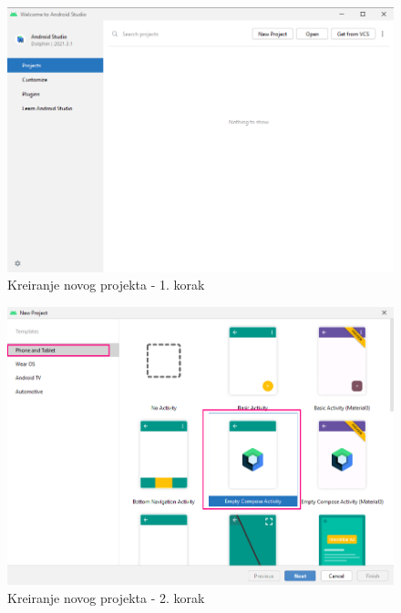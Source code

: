 \documentclass[11pt,a4paper,twoside]{article}
\begin{document}
\begin{figure}[!h]
	\centering
	\includegraphics[width=\textwidth]{new_project_01.png}
	\caption{Kreiranje novog projekta - 1. korak}
	\label{fig:new_project_01}	
\end{figure}

\begin{figure}[!h]
	\centering
	\includegraphics[width=\textwidth]{new_project_02.png}
	\caption{Kreiranje novog projekta - 2. korak}
	\label{fig:new_project_02}	
\end{figure}
\end{document}
